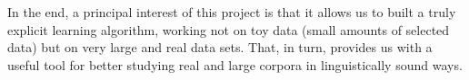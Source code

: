 \documentclass[output=paper,colorlinks,citecolor=brown]{langscibook}
\begin{document}
In the end, a principal interest of this project is that it allows us to built a truly explicit learning algorithm, working not on toy data (small amounts of selected data) but on very large and real data sets. That, in turn, provides us with a useful tool for better studying real and large corpora in linguistically sound ways. 










 

\printbibliography[heading=subbibliography,notkeyword=this]
\end{document}
